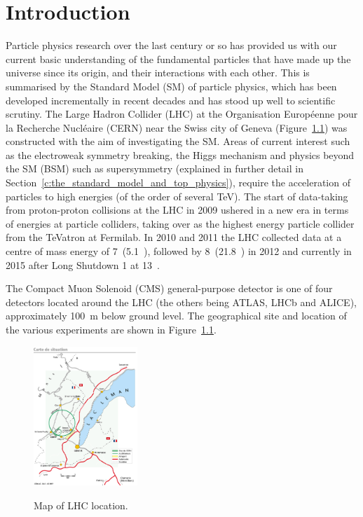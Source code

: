 \chapter{Introduction}
\label{c:introduction}

Particle physics research over the last century or so has provided us with our current basic understanding of
the fundamental particles that have made up the universe since its origin, and their interactions with each
other. This is summarised by the Standard Model (SM) of particle physics, which has been developed
incrementally in recent decades and has stood up well to scientific scrutiny. The Large Hadron Collider (LHC)
at the Organisation Europ\'{e}enne pour la Recherche Nucl\'{e}aire (CERN) near the Swiss city of Geneva
(Figure~\ref{fig:LHC_map}) was constructed with the aim of investigating the SM. Areas of current interest
such as the electroweak symmetry breaking, the Higgs mechanism and physics beyond the SM (BSM) such
as supersymmetry (explained in further detail in Section~\ref{c:the_standard_model_and_top_physics}), require
the acceleration of particles to high energies (of the order of several TeV). The start of data-taking from proton-proton collisions at the
LHC in 2009 ushered in a new era in terms of energies at particle colliders, taking over as the highest energy
particle collider from the TeVatron at Fermilab. In 2010 and 2011 the LHC collected data at a centre of mass
energy of 7~\TeV (5.1~\fbinv), followed by 8~\TeV (21.8~\fbinv) in 2012 and currently in 2015 after Long
Shutdown 1 at 13~\TeV.

The Compact Muon Solenoid (CMS) general-purpose detector is one of four detectors located around the LHC (the
others being ATLAS, LHCb and ALICE), approximately 100~m below ground level. The geographical site and
location of the various experiments are shown in Figure~\ref{fig:LHC_map}.

\begin{figure}[hbtp]
   \centering
     \includegraphics[width=0.35\textwidth]{Chapters/01_Introduction/Images/lhc-pho-1997-169.jpg}\\
     \caption{Map of LHC location.}
     \label{fig:LHC_map}
\end{figure}

